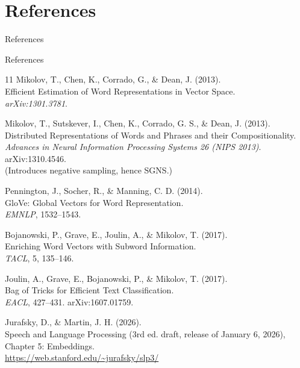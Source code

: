 \section{References}
\begin{frame}{}
    \LARGE References
\end{frame}

\begin{frame}[allowframebreaks]{References}
    \begin{thebibliography}{11}
        Mikolov, T., Chen, K., Corrado, G., \& Dean, J. (2013).\\
        Efficient Estimation of Word Representations in Vector Space.\\
        \textit{arXiv:1301.3781}.

        Mikolov, T., Sutskever, I., Chen, K., Corrado, G. S., \& Dean, J. (2013).\\
        Distributed Representations of Words and Phrases and their Compositionality.\\
        \textit{Advances in Neural Information Processing Systems 26 (NIPS 2013)}. arXiv:1310.4546.\\
        (Introduces negative sampling, hence SGNS.)

        Pennington, J., Socher, R., \& Manning, C. D. (2014).\\
        GloVe: Global Vectors for Word Representation.\\
        \textit{EMNLP}, 1532--1543.

        Bojanowski, P., Grave, E., Joulin, A., \& Mikolov, T. (2017).\\
        Enriching Word Vectors with Subword Information.\\
        \textit{TACL}, 5, 135--146.

        Joulin, A., Grave, E., Bojanowski, P., \& Mikolov, T. (2017).\\
        Bag of Tricks for Efficient Text Classification.\\
        \textit{EACL}, 427--431. arXiv:1607.01759.

        Jurafsky, D., \& Martin, J. H. (2026).\\
        Speech and Language Processing (3rd ed. draft, release of January 6, 2026),\\
        Chapter 5: Embeddings.\\
        \url{https://web.stanford.edu/~jurafsky/slp3/}


\end{thebibliography}
\end{frame}
